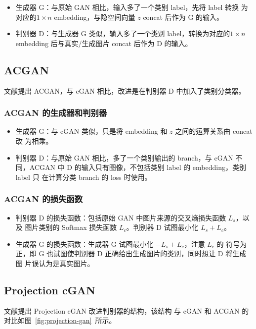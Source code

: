 \begin{itemize}
  \item 生成器 G：与原始 GAN 相比，输入多了一个类别 label，先将 label 转换
    为对应的$1 \times n$ embedding，与隐空间向量 $z$ concat 后作为 G 的输入。
  \item 判别器 D：与生成器 G 类似，输入多了一个类别 label，转换为对应的$1 \times
    n$ embedding 后与真实/生成图片 concat 后作为 D 的输入。
\end{itemize}

\subsection{ACGAN}
文献提出 ACGAN，与 cGAN 相比，改进是在判别器 D 中加入了类别分类器。

\subsubsection{ACGAN 的生成器和判别器}
\begin{itemize}
  \item 生成器 G：与 cGAN 类似，只是将 embedding 和 $z$ 之间的运算关系由 concat 改
    为相乘。
  \item 判别器 D：与原始 GAN 相比，多了一个类别输出的 branch，与 cGAN 不
    同，ACGAN 中 D 的输入只有图像，不包括类别 label 的 embedding，类别 label 只
    在计算分类 branch 的 loss 时使用。
\end{itemize}

\subsubsection{ACGAN 的损失函数}
\begin{itemize}
  \item 判别器 D 的损失函数：包括原始 GAN 中图片来源的交叉熵损失函数 $L_{s}$，以及
    图片类别的 Softmax 损失函数 $L_{c}$。判别器 D 试图最小化 $L_{s} + L_{c}$。
  \item 生成器 G 的损失函数：生成器 G 试图最小化 $-L_{s} + L_{c}$，注意 $L_{c}$ 的
    符号为正，即 G 也试图使判别器 D 正确给出生成图片的类别，同时想让 D 将生成图
    片误认为是真实图片。
\end{itemize}

\subsection{Projection cGAN}
文献提出 Projection cGAN 改进判别器的结构，该结构
与 cGAN 和 ACGAN 的对比如图~\ref{fig:projection-gan}~所示。

